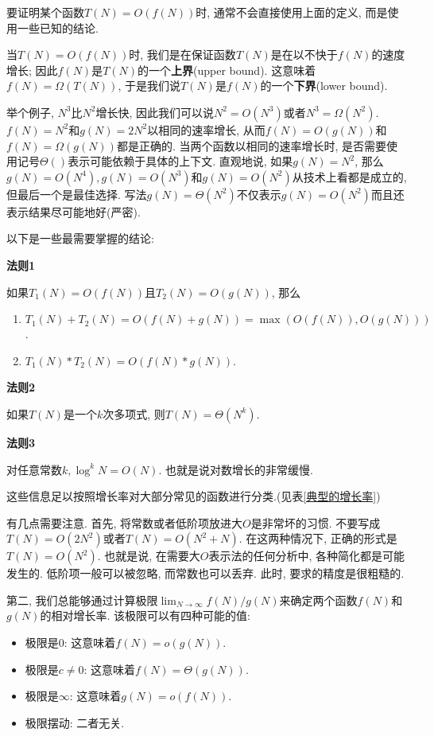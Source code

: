 \documentclass[oneside]{ctexbook}
\begin{document}
{要证明某个函数$T(N)=O(f(N))$时, 通常不会直接使用上面的定义, 而是使用一些已知的结论.

当$T(N)=O(f(N))$时, 我们是在保证函数$T(N)$是在以不快于$f(N)$的速度增长; 因此$f(N)$是$T(N)$的一个\textbf{上界}(upper bound). 这意味着$f(N)=\Omega(T(N))$, 于是我们说$T(N)$是$f(N)$的一个\textbf{下界}(lower bound).

举个例子, $N^3$比$N^2$增长快, 因此我们可以说$N^2=O(N^3)$或者$N^3=\Omega(N^2)$. $f(N)=N^2$和$g(N)=2N^2$以相同的速率增长, 从而$f(N)=O(g(N))$和$f(N)=\Omega(g(N))$都是正确的. 当两个函数以相同的速率增长时, 是否需要使用记号$\varTheta()$表示可能依赖于具体的上下文. 直观地说, 如果$g(N)=N^2$, 那么$g(N)=O(N^4), g(N)=O(N^3)$和$g(N)=O(N^2)$从技术上看都是成立的, 但最后一个是最佳选择. 写法$g(N)=\varTheta(N^2)$不仅表示$g(N)=O(N^2)$而且还表示结果尽可能地好(严密).

以下是一些最需要掌握的结论:

\textbf{法则1}

如果$T_1(N)=O(f(N))$且$T_2(N)=O(g(N))$, 那么

\begin{enumerate}
    \item $T_1(N)+T_2(N)=O(f(N) + g(N))=\max{(O(f(N)), O(g(N)))}$.
    \item $T_1(N)*T_2(N)=O(f(N) * g(N))$.
\end{enumerate}

\textbf{法则2}

如果$T(N)$是一个$k$次多项式, 则$T(N)=\varTheta(N^k)$.

\textbf{法则3}

对任意常数$k, \log^kN=O(N)$. 也就是说对数增长的非常缓慢.

这些信息足以按照增长率对大部分常见的函数进行分类.(见表\ref{典型的增长率})

有几点需要注意. 首先, 将常数或者低阶项放进大$O$是非常坏的习惯. 不要写成$T(N)=O(2N^2)$或者$T(N)=O(N^2+N)$. 在这两种情况下, 正确的形式是$T(N)=O(N^2)$. 也就是说, 在需要大$O$表示法的任何分析中, 各种简化都是可能发生的. 低阶项一般可以被忽略, 而常数也可以丢弃. 此时, 要求的精度是很粗糙的.

第二, 我们总能够通过计算极限$\lim_{N\to\infty}f(N)/g(N)$来确定两个函数$f(N)$和$g(N)$的相对增长率. 该极限可以有四种可能的值:

\begin{itemize}
    \item 极限是$0$: 这意味着$f(N)=o(g(N))$.
    \item 极限是$c\neq 0$: 这意味着$f(N)=\varTheta(g(N))$.
    \item 极限是$\infty$: 这意味着$g(N)=o(f(N))$.
    \item 极限摆动: 二者无关.
\end{itemize}

}
\end{document}
